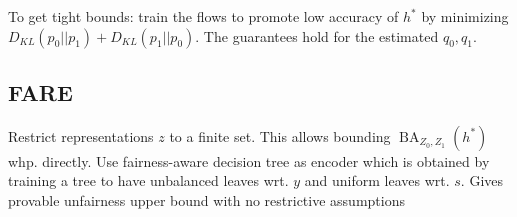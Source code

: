 To get tight bounds: train the flows to promote low accuracy of $h^*$ by minimizing $D_{KL}(p_0||p_1)+D_{KL}(p_1||p_0)$. \Warning The guarantees hold for the estimated $q_0,q_1$.

\subsection*{FARE}
Restrict representations $z$ to a finite set. This allows bounding $\operatorname{BA}_{Z_0,Z_1}(h^*)$ whp. directly. Use fairness-aware decision tree as encoder which is obtained by training a tree to have unbalanced leaves wrt. $y$ and uniform leaves wrt. $s$. Gives provable unfairness upper bound with no restrictive assumptions